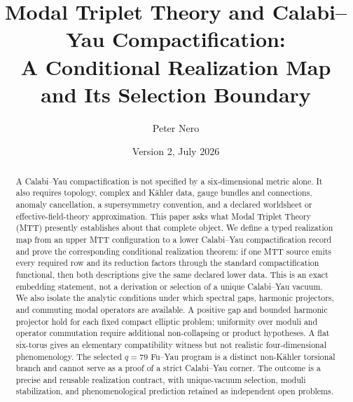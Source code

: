 \documentclass[11pt]{article}
\title{\vspace{-1em}
Modal Triplet Theory and Calabi--Yau Compactification:\\[0.25em]
\large A Conditional Realization Map and Its Selection Boundary}
\author{Peter Nero}
\date{Version 2, July 2026}
\theoremstyle{definition}
\theoremstyle{remark}
\begin{document}
\maketitle

\begin{abstract}
A Calabi--Yau compactification is not specified by a six-dimensional metric
alone.  It also requires topology, complex and K\"ahler data, gauge bundles
and connections, anomaly cancellation, a supersymmetry convention, and a
declared worldsheet or effective-field-theory approximation.  This paper asks
what Modal Triplet Theory (MTT) presently establishes about that complete
object.  We define a typed realization map from an upper MTT configuration to
a lower Calabi--Yau compactification record and prove the corresponding
conditional realization theorem: if one MTT source emits every required row
and its reduction factors through the standard compactification functional,
then both descriptions give the same declared lower data.  This is an exact
embedding statement, not a derivation or selection of a unique Calabi--Yau
vacuum.  We also isolate the analytic conditions under which spectral gaps,
harmonic projectors, and commuting modal operators are available.  A positive
gap and bounded harmonic projector hold for each fixed compact elliptic
problem; uniformity over moduli and operator commutation require additional
non-collapsing or product hypotheses.  A flat six-torus gives an elementary
compatibility witness but not realistic four-dimensional phenomenology.  The
selected \(q=79\) Fu--Yau program is a distinct non-K\"ahler torsional branch
and cannot serve as a proof of a strict Calabi--Yau corner.  The outcome is a
precise and reusable realization contract, with unique-vacuum selection,
moduli stabilization, and phenomenological prediction retained as
independent open problems.
\end{abstract}
\end{document}
